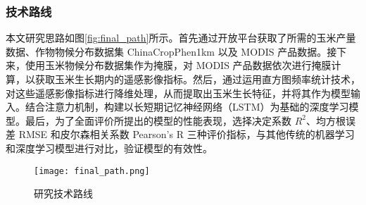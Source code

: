 \subsubsection{技术路线}
\par 本文研究思路如图\autoref{fig:final_path}所示。首先通过开放平台获取了所需的玉米产量数据、作物物候分布数据集 ChinaCropPhen1km 以及 MODIS 产品数据。接下来，使用玉米物候分布数据集作为掩膜，对 MODIS 产品数据依次进行掩膜计算，以获取玉米生长期内的遥感影像指标。然后，通过运用直方图频率统计技术，对这些遥感影像指标进行降维处理，从而提取出玉米生长特征，并将其作为模型输入。结合注意力机制，构建以长短期记忆神经网络（LSTM）为基础的深度学习模型。最后，为了全面评价所提出的模型的性能表现，选择决定系数 $R^2$、均方根误差 RMSE 和皮尔森相关系数 Pearson's R 三种评价指标，与其他传统的机器学习和深度学习模型进行对比，验证模型的有效性。

\begin{figure}
  \centering
  \texttt{[image: final\_path.png]}
  \caption{研究技术路线}
  \label{fig:final_path}
\end{figure}
